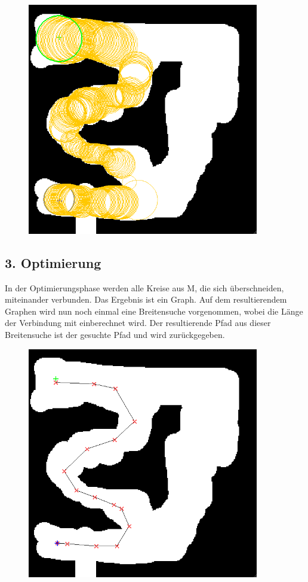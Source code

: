 \begin{figure}[ht]
    \centering
	\includegraphics[width=0.9\textwidth, angle=0]{img/p4.png} 
\end{figure}

\subsection*{3. Optimierung}
	In der Optimierungsphase werden alle Kreise aus M, die sich überschneiden, miteinander verbunden. Das Ergebnis ist ein Graph. Auf dem resultierendem Graphen wird nun noch einmal eine Breitensuche vorgenommen, wobei die Länge der Verbindung mit einberechnet wird. Der resultierende Pfad aus dieser Breitensuche ist der gesuchte Pfad und wird zurückgegeben. \\
	
\begin{figure}[ht]
    \centering
	\includegraphics[width=0.9\textwidth, angle=0]{img/p5.png} 
\end{figure}